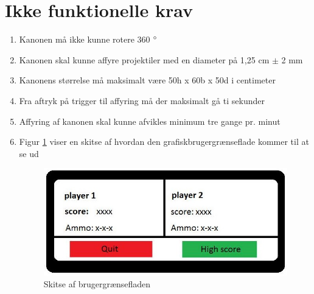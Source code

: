 \section{Ikke funktionelle krav}
\label{afsnit:ikkeFunkKrav}
\begin{enumerate}
	\item Kanonen må ikke kunne rotere 360 \(\degree\)
	\item Kanonen skal kunne affyre projektiler med en diameter på 1,25 cm \(\pm\) 2 mm
	\item Kanonens størrelse må maksimalt være 50h x 60b x 50d i centimeter
	\item Fra aftryk på trigger til affyring må der maksimalt gå ti sekunder
	\item Affyring af kanonen skal kunne afvikles minimum tre gange pr. minut
	\item Figur \ref{ref:brugergraesefladeskitse}  viser en skitse af hvordan den grafiskbrugergrænseflade kommer til at se ud
		\begin{figure}[h]
			\centering
			\includegraphics[width=\textwidth]{Kravspecifikation/images/brugergraensefladeskitse}
			\caption{Skitse af brugergrænsefladen}
			\label{ref:brugergraesefladeskitse}
		\end{figure}
\end{enumerate}